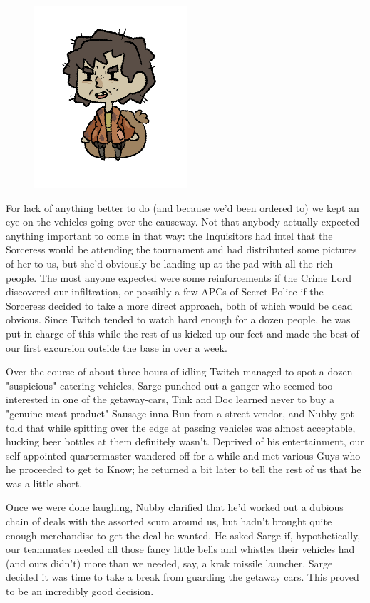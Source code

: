 \begin{figure}
	\begin{center}
		\includegraphics[width=\figwidth]{pics/18/49.png}
	\end{center}
\end{figure}
For lack of anything better to do (and because we'd been ordered to) we kept an eye on the vehicles going over the causeway. 
Not that anybody actually expected anything important to come in that way: 
the Inquisitors had intel that the Sorceress would be attending the tournament and had distributed some pictures of her to us, but she'd obviously be landing up at the pad with all the rich people. 
The most anyone expected were some reinforcements if the Crime Lord discovered our infiltration, or possibly a few APCs of Secret Police if the Sorceress decided to take a more direct approach, both of which would be dead obvious. 
Since Twitch tended to watch hard enough for a dozen people, he was put in charge of this while the rest of us kicked up our feet and made the best of our first excursion outside the base in over a week.

Over the course of about three hours of idling Twitch managed to spot a dozen "suspicious" catering vehicles, Sarge punched out a ganger who seemed too interested in one of the getaway-cars, Tink and Doc learned never to buy a "genuine meat product" Sausage-inna-Bun from a street vendor, and Nubby got told that while spitting over the edge at passing vehicles was almost acceptable, hucking beer bottles at them definitely wasn't. 
Deprived of his entertainment, our self-appointed quartermaster wandered off for a while and met various Guys who he proceeded to get to Know; 
he returned a bit later to tell the rest of us that he was a little short. 


Once we were done laughing, Nubby clarified that he'd worked out a dubious chain of deals with the assorted scum around us, but hadn't brought quite enough merchandise to get the deal he wanted. 
He asked Sarge if, hypothetically, our teammates needed all those fancy little bells and whistles their vehicles had (and ours didn't) more than we needed, say, a krak missile launcher. 
Sarge decided it was time to take a break from guarding the getaway cars. 
This proved to be an incredibly good decision.

